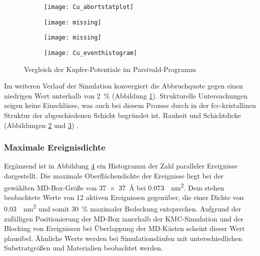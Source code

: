 \begin{figure}[bth]
  \captionsetup[subfigure]{singlelinecheck=false}
  \def\subfigwidth{0.49\textwidth}
  \begin{subfigure}[t]{\subfigwidth}
    \texttt{[image: Cu\_abortstatplot]}
    \label{fig:copperparsivald-a}
  \end{subfigure}
  \hfill
  \begin{subfigure}[t]{\subfigwidth}
    \texttt{[image: missing]}
    \label{fig:copperparsivald-b}
  \end{subfigure}
  \begin{subfigure}[t]{\subfigwidth}
    \texttt{[image: missing]}
    \label{fig:copperparsivald-c}
  \end{subfigure}
  \hfill
  \begin{subfigure}[t]{\subfigwidth}
    \texttt{[image: Cu\_eventhistogram]}
    \label{fig:copperparsivald-d}
  \end{subfigure}
  \caption{Vergleich der Kupfer-Potentiale im Parsivald-Programm}
  \label{fig:copperparsivald}
\end{figure}

Im weiteren Verlauf der Simulation konvergiert die Abbruchquote gegen einen niedrigen Wert unterhalb von \SI{2}{\percent} (Abbildung \ref{fig:copperparsivald-a}).
Strukturelle Untersuchungen zeigen keine Einschlüsse, was auch bei diesem Prozess durch in der fcc-kristallinen Struktur der abgeschiedenen Schicht begründet ist.
Rauheit und Schichtdicke (Abbildungen \ref{fig:copperparsivald-b} und \ref{fig:copperparsivald-c}) .

\subsubsection{Maximale Ereignisdichte}
Ergänzend ist in Abbildung \ref{fig:copperparsivald-d} ein Histogramm der Zahl paralleler Ereignisse dargestellt.
Die maximale Oberflächendichte der Ereignisse liegt bei der gewählten MD-Box-Größe von \SI{37x37}{\angstrom} bei \SI{0.073}{\per\nano\meter\squared}.
Dem stehen beobachtete Werte von 12 aktiven Ereignissen gegenüber, die einer Dichte von \SI{0.03}{\per\nano\meter\squared} und somit \SI{30}{\percent} maximaler Bedeckung entsprechen.
Aufgrund der zufälligen Positionierung der MD-Box innerhalb der KMC-Simulation und der Blocking von Ereignissen bei Überlappung der MD-Kästen scheint dieser Wert plausibel.
Ähnliche Werte werden bei Simulationsläufen mit unterschiedlichen Substratgrößen und Materialien beobachtet werden.
